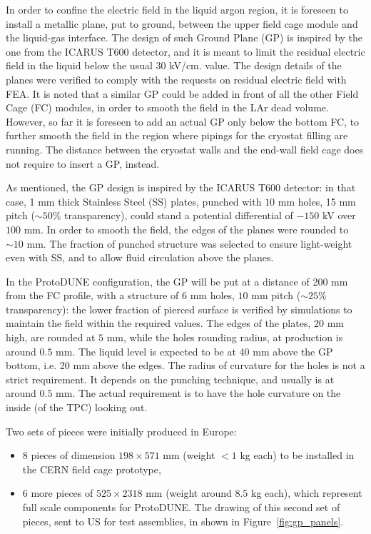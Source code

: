 In order to confine the electric field in the liquid argon region, it is foreseen to install a metallic plane, put to ground, between the upper field cage module and the liquid-gas interface. The design of such Ground Plane (GP) is inspired by the one from the ICARUS T600 detector, and it is meant to limit the residual electric field in the liquid below the usual 30 kV/cm. value. The design details of the planes were verified to comply with the requests on residual electric field with FEA. It is noted that a similar GP could be added in front of all the other Field Cage (FC) modules, in order to smooth the field in the LAr dead volume. However, so far it is foreseen to add an actual GP only below the bottom FC, to further smooth the field in the region where pipings for the cryostat filling are running. The distance between the cryostat walls and the end-wall field cage does not require to insert a GP, instead.

As mentioned, the GP design is inspired by the ICARUS T600 detector: in that case, 1 mm thick Stainless Steel (SS) plates, punched with $10$ mm holes, 15 mm pitch ($\sim 50\%$ transparency), could stand a potential differential of $-150$ kV over $100$ mm. In order to smooth the field, the edges of the planes were rounded to $\sim 10$ mm. The fraction of punched structure was selected to ensure light-weight even with SS, and to allow fluid circulation above the planes.

In the ProtoDUNE configuration, the GP will be put at a distance of 200 mm from the FC profile, with a structure of $6$ mm holes, $10$ mm pitch ($\sim 25\%$ transparency): the lower fraction of pierced surface is verified by simulations to maintain the field within the required values. The edges of the plates, $20$ mm high, are rounded at $5$ mm, while the holes rounding radius, at production is around $0.5$ mm. The liquid level is expected to be at 40 mm above the GP bottom, i.e. 20 mm above the edges. The radius of curvature for the holes is not a strict requirement. It depends on the punching technique, and usually is at around $0.5$ mm. The actual requirement is to have the hole curvature on the inside (of the TPC) looking out.

Two sets of pieces were initially produced in Europe:
\begin{itemize}
\item 8 pieces of dimension $198 \times 571$ mm (weight $< 1$ kg each) to be installed in the CERN field cage prototype,
\item 6 more pieces of  $525 \times 2318$ mm (weight around $8.5$ kg each), which represent full scale components for ProtoDUNE. The drawing of this second set of pieces, sent to US for test assemblies, in shown in Figure~\ref{fig:gp_panels}.
\end{itemize}

